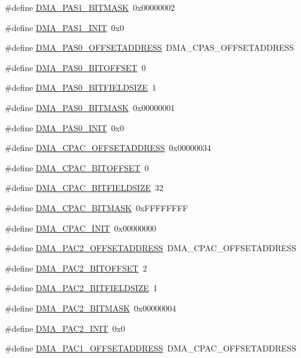 \begin{DoxyCompactItemize}
\item 
\#define \hyperlink{a00547_a043f8004332a35a2aa477785c156085f}{DMA\_\-PAS1\_\-BITMASK}~0x00000002
\item 
\#define \hyperlink{a00547_ab297c98415d9bb6ab9fb929899f1613a}{DMA\_\-PAS1\_\-INIT}~0x0
\item 
\#define \hyperlink{a00547_a7e0d3ff0470468d27f03666b5885dd0e}{DMA\_\-PAS0\_\-OFFSETADDRESS}~DMA\_\-CPAS\_\-OFFSETADDRESS
\item 
\#define \hyperlink{a00547_a4f74a5041ded7ccff94284b7ca154911}{DMA\_\-PAS0\_\-BITOFFSET}~0
\item 
\#define \hyperlink{a00547_a65408e57bcc7c804db7b0f9af76ea34e}{DMA\_\-PAS0\_\-BITFIELDSIZE}~1
\item 
\#define \hyperlink{a00547_a327873e68c74c1b5f34c28543a3bff71}{DMA\_\-PAS0\_\-BITMASK}~0x00000001
\item 
\#define \hyperlink{a00547_a200255c9b463780b848010247a6faacb}{DMA\_\-PAS0\_\-INIT}~0x0
\item 
\#define \hyperlink{a00547_a15aa12f396c9727bab38b98cae8dccdd}{DMA\_\-CPAC\_\-OFFSETADDRESS}~0x00000034
\item 
\#define \hyperlink{a00547_a889aade1ad8ede0eb7a6ec9911811f43}{DMA\_\-CPAC\_\-BITOFFSET}~0
\item 
\#define \hyperlink{a00547_acdbb5f934b4ac2a30073ca24f65c9d90}{DMA\_\-CPAC\_\-BITFIELDSIZE}~32
\item 
\#define \hyperlink{a00547_af1c0aa27b7d86a883d3ad593dd7ae040}{DMA\_\-CPAC\_\-BITMASK}~0xFFFFFFFF
\item 
\#define \hyperlink{a00547_afa5087223be1650ae0942f5e5866363b}{DMA\_\-CPAC\_\-INIT}~0x00000000
\item 
\#define \hyperlink{a00547_a59f4ab931db8721c4394452c101c96ca}{DMA\_\-PAC2\_\-OFFSETADDRESS}~DMA\_\-CPAC\_\-OFFSETADDRESS
\item 
\#define \hyperlink{a00547_a9342ba6285d494612a2d4344ed4066c4}{DMA\_\-PAC2\_\-BITOFFSET}~2
\item 
\#define \hyperlink{a00547_a52048befe5b9124eb26a89bf2ecc1e70}{DMA\_\-PAC2\_\-BITFIELDSIZE}~1
\item 
\#define \hyperlink{a00547_a8f1e8594124d2ea615ed054eeda05934}{DMA\_\-PAC2\_\-BITMASK}~0x00000004
\item 
\#define \hyperlink{a00547_a5a5806a142faf81c12709459dcd1dff9}{DMA\_\-PAC2\_\-INIT}~0x0
\item 
\#define \hyperlink{a00547_a783969ef9cf7d77624256638aea0607d}{DMA\_\-PAC1\_\-OFFSETADDRESS}~DMA\_\-CPAC\_\-OFFSETADDRESS

\end{DoxyCompactItemize}
